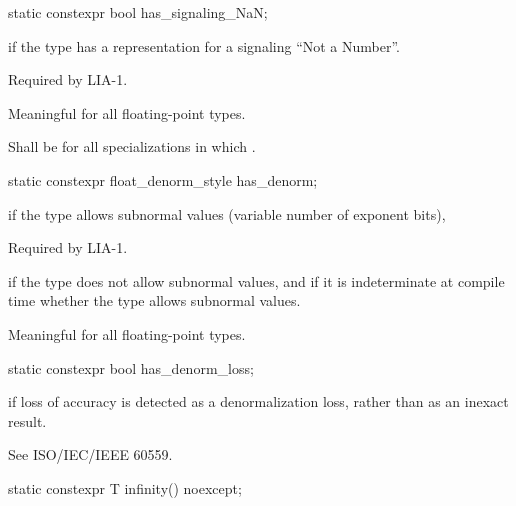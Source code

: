 %
\begin{itemdecl}
static constexpr bool has_signaling_NaN;
\end{itemdecl}

\begin{itemdescr}
\pnum
{} if the type has a representation for a signaling ``Not a Number''.
\begin{footnote}
Required by LIA-1.
\end{footnote}

\pnum
Meaningful for all floating-point types.

\pnum
Shall be
for all specializations in which
.
\end{itemdescr}

%
\begin{itemdecl}
static constexpr float_denorm_style has_denorm;
\end{itemdecl}

%
\begin{itemdescr}
\pnum
{}
if the type allows subnormal values
(variable number of exponent bits),
\begin{footnote}
Required by LIA-1.
\end{footnote}
if the type does not allow subnormal values,
and
if it is indeterminate at compile time whether the type allows
subnormal values.

\pnum
Meaningful for all floating-point types.
\end{itemdescr}

%
\begin{itemdecl}
static constexpr bool has_denorm_loss;
\end{itemdecl}

\begin{itemdescr}
\pnum
{} if loss of accuracy is detected as a
denormalization loss, rather than as an inexact result.
\begin{footnote}
See
ISO/IEC/IEEE 60559.
\end{footnote}
\end{itemdescr}

%
\begin{itemdecl}
static constexpr T infinity() noexcept;
\end{itemdecl}

